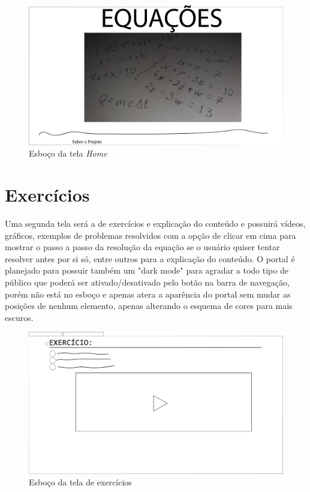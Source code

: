 \documentclass[12pt]{report}
\begin{document}
\begin{figure}[H]
    \includegraphics[width=1\textwidth]{img/c.png}
    \caption{Esboço da tela \textit{Home}}
\end{figure}

\section{Exercícios}
Uma segunda tela será a de exercícios e explicação do conteúdo e possuirá vídeos, gráficos, exemplos de problemas resolvidos com a opção de clicar em cima para mostrar o passo a passo da resolução da equação se o usuário quiser tentar resolver antes por si só, entre outros para a explicação do conteúdo. O portal é planejado para possuir também um "dark mode" para agradar a todo tipo de público que poderá ser ativado/desativado pelo botão na barra de navegação, porém não está no esboço e apenas atera a aparência do portal sem mudar as posições de nenhum elemento, apenas alterando o esquema de cores para mais escuros.

\begin{figure}[H]
    \includegraphics[width=1\textwidth]{img/A.jpg}
    \caption{Esboço da tela de exercícios}
\end{figure}
\end{document}
